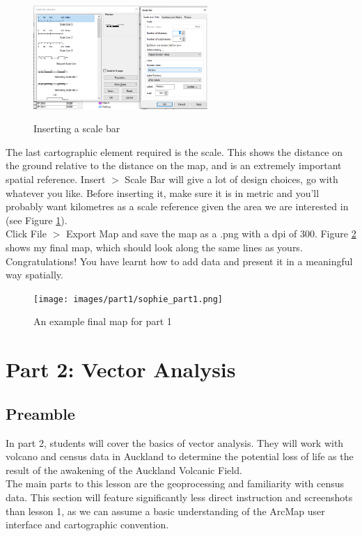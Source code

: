 \documentclass{article}
\begin{document}
\begin{figure}[h]
    \centering
    \caption{Inserting a scale bar}
    \includegraphics[width=250px]{images/part1/layout_scalebar.PNG}
    \label{layout_scalebar}
\end{figure}

The last cartographic element required is the scale. This shows the distance on the ground relative to the distance on the map, and is an extremely important spatial reference. Insert $>$ Scale Bar will give a lot of design choices, go with whatever you like. Before inserting it, make sure it is in metric and you'll probably want kilometres as a scale reference given the area we are interested in (see Figure \ref{layout_scalebar}).\\

Click File $>$ Export Map and save the map as a .png with a dpi of 300. Figure \ref{example_part1} shows my final map, which should look along the same lines as yours. Congratulations! You have learnt how to add data and present it in a meaningful way spatially.

\begin{figure}[h]
    \centering
    \caption{An example final map for part 1}
    \texttt{[image: images/part1/sophie\_part1.png]}
    \label{example_part1}
\end{figure}
\pagebreak

\section{Part 2: Vector Analysis}
\subsection{Preamble}
In part 2, students will cover the basics of vector analysis. They will work with volcano and census data in Auckland to determine the potential loss of life as the result of the awakening of the Auckland Volcanic Field. \\

The main parts to this lesson are the geoprocessing and familiarity with census data. This section will feature significantly less direct instruction and screenshots than lesson 1, as we can assume a basic understanding of the ArcMap user interface and cartographic convention.
\end{document}
